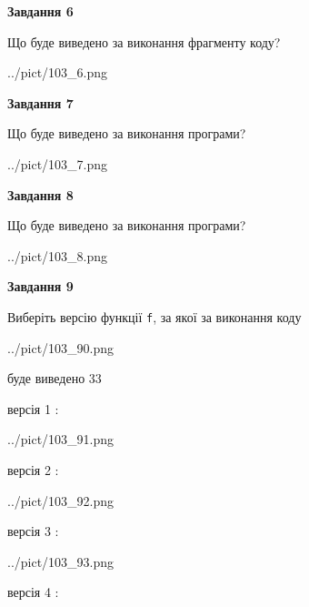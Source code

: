 \documentclass[12pt, ukrainian]{article}
\def\code#1{\Verb!#1!}
\begin{document}
{\begin {large}
{\begin {center}\textbf{Завдання 6}\end {center}}

Що буде виведено за виконання фрагменту коду?\par
\begin{center}
	{../pict/103_6.png}
\end{center}
\newpage

{\begin {center}\textbf{Завдання 7}\end {center}}

Що буде виведено за виконання програми?\par
\begin{center}
	{../pict/103_7.png}
\end{center}
\newpage

{\begin {center}\textbf{Завдання 8}\end {center}}

Що буде виведено за виконання програми?\par
\begin{center}
	{../pict/103_8.png}
\end{center}
\newpage

{\begin {center}\textbf{Завдання 9}\end {center}}

Виберіть версію функції \code{f}, за якої за виконання коду
\begin{center}
	{../pict/103_90.png}
\end{center}
буде виведено 33

\vspace{5mm}
версія 1 :

\begin{center}
	{../pict/103_91.png}
\end{center}
версія 2 :

\begin{center}
	{../pict/103_92.png}
\end{center}
версія 3 :

\begin{center}
	{../pict/103_93.png}
\end{center}
версія 4 :


\end{large}}
\end{document}
